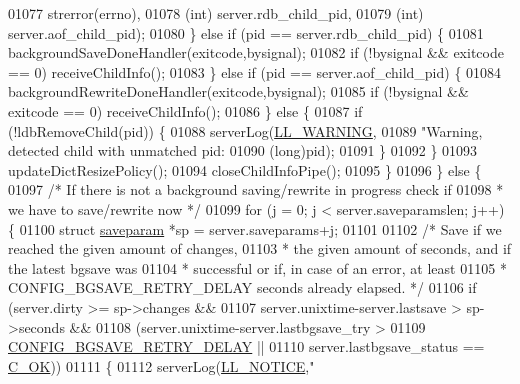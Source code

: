 \begin{DoxyCode}
{{{{{{{{{01077                     strerror(errno),
01078                     (\textcolor{keywordtype}{int}) server.rdb\_child\_pid,
01079                     (\textcolor{keywordtype}{int}) server.aof\_child\_pid);
01080             \} \textcolor{keywordflow}{else} \textcolor{keywordflow}{if} (pid == server.rdb\_child\_pid) \{
01081                 backgroundSaveDoneHandler(exitcode,bysignal);
01082                 \textcolor{keywordflow}{if} (!bysignal && exitcode == 0) receiveChildInfo();
01083             \} \textcolor{keywordflow}{else} \textcolor{keywordflow}{if} (pid == server.aof\_child\_pid) \{
01084                 backgroundRewriteDoneHandler(exitcode,bysignal);
01085                 \textcolor{keywordflow}{if} (!bysignal && exitcode == 0) receiveChildInfo();
01086             \} \textcolor{keywordflow}{else} \{
01087                 \textcolor{keywordflow}{if} (!ldbRemoveChild(pid)) \{
01088                     serverLog(\hyperlink{server_8h_a31229b9334bba7d6be2a72970967a14b}{LL\_WARNING},
01089                         \textcolor{stringliteral}{"Warning, detected child with unmatched pid: %
01090                         (\textcolor{keywordtype}{long})pid);
01091                 \}
01092             \}
01093             updateDictResizePolicy();
01094             closeChildInfoPipe();
01095         \}
01096     \} \textcolor{keywordflow}{else} \{
01097         \textcolor{comment}{/* If there is not a background saving/rewrite in progress check if}
01098 \textcolor{comment}{         * we have to save/rewrite now */}
01099          \textcolor{keywordflow}{for} (j = 0; j < server.saveparamslen; j++) \{
01100             \textcolor{keyword}{struct} \hyperlink{structsaveparam}{saveparam} *sp = server.saveparams+j;
01101 
01102             \textcolor{comment}{/* Save if we reached the given amount of changes,}
01103 \textcolor{comment}{             * the given amount of seconds, and if the latest bgsave was}
01104 \textcolor{comment}{             * successful or if, in case of an error, at least}
01105 \textcolor{comment}{             * CONFIG\_BGSAVE\_RETRY\_DELAY seconds already elapsed. */}
01106             \textcolor{keywordflow}{if} (server.dirty >= sp->changes &&
01107                 server.unixtime-server.lastsave > sp->seconds &&
01108                 (server.unixtime-server.lastbgsave\_try >
01109                  \hyperlink{server_8h_a27e00ebd25c04beef22fabf61ea0b5ea}{CONFIG\_BGSAVE\_RETRY\_DELAY} ||
01110                  server.lastbgsave\_status == \hyperlink{server_8h_a303769ef1065076e68731584e758d3e1}{C\_OK}))
01111             \{
01112                 serverLog(\hyperlink{server_8h_a8c54c191e436c7dd3012167212692401}{LL\_NOTICE},\textcolor{stringliteral}{"%
}}}}}}}}}}}
\end{DoxyCode}
